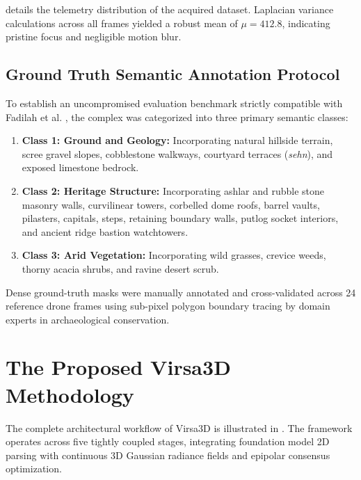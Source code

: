 \documentclass[11pt,a4paper]{article}
\begin{document}
 details the telemetry distribution of the acquired dataset. Laplacian variance calculations across all frames yielded a robust mean of $\mu = 412.8$, indicating pristine focus and negligible motion blur.

\subsection{Ground Truth Semantic Annotation Protocol}
To establish an uncompromised evaluation benchmark strictly compatible with Fadilah et al. \cite{fadilah2024multiview}, the complex was categorized into three primary semantic classes:
\begin{enumerate}
    \item \textbf{Class 1: Ground and Geology:} Incorporating natural hillside terrain, scree gravel slopes, cobblestone walkways, courtyard terraces (\textit{sehn}), and exposed limestone bedrock.
    \item \textbf{Class 2: Heritage Structure:} Incorporating ashlar and rubble stone masonry walls, curvilinear towers, corbelled dome roofs, barrel vaults, pilasters, capitals, steps, retaining boundary walls, putlog socket interiors, and ancient ridge bastion watchtowers.
    \item \textbf{Class 3: Arid Vegetation:} Incorporating wild grasses, crevice weeds, thorny acacia shrubs, and ravine desert scrub.
\end{enumerate}
Dense ground-truth masks were manually annotated and cross-validated across 24 reference drone frames using sub-pixel polygon boundary tracing by domain experts in archaeological conservation.
\section{The Proposed Virsa3D Methodology}
\label{sec:methodology}

The complete architectural workflow of Virsa3D is illustrated in . The framework operates across five tightly coupled stages, integrating foundation model 2D parsing with continuous 3D Gaussian radiance fields and epipolar consensus optimization.
\end{document}
